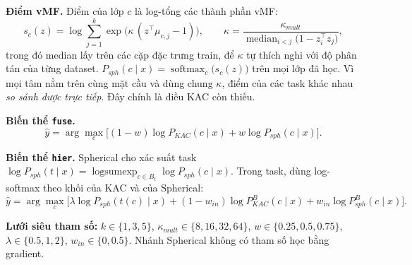 \documentclass[10pt,a4paper]{article}
\begin{document}
\textbf{Điểm vMF.} Điểm của lớp $c$ là log-tổng các thành phần vMF:
\begin{equation}
s_c(z) = \log \sum_{j=1}^{k} \exp\!\big(\kappa\,(z^\top \mu_{c,j} - 1)\big), \qquad
\kappa = \frac{\kappa_{mult}}{\operatorname{median}_{i<j}\big(1 - z_i^\top z_j\big)},
\end{equation}
trong đó median lấy trên các cặp đặc trưng train, để $\kappa$ tự thích nghi với độ phân tán của từng dataset. $P_{sph}(c\mid x) = \operatorname{softmax}_c\big(s_c(z)\big)$ trên mọi lớp đã học. Vì mọi tâm nằm trên cùng mặt cầu và dùng chung $\kappa$, điểm của các task khác nhau \emph{so sánh được trực tiếp}. Đây chính là điều KAC còn thiếu.

\textbf{Biến thể \texttt{fuse}.}
\begin{equation}
\label{eq:fuse}
\hat y = \arg\max_c \Big[(1-w)\log P_{KAC}(c\mid x) + w \log P_{sph}(c\mid x)\Big].
\end{equation}

\textbf{Biến thể \texttt{hier}.} Spherical cho xác suất task $\log P_{sph}(t\mid x) = \operatorname{logsumexp}_{c\in B_t}\log P_{sph}(c\mid x)$. Trong task, dùng log-softmax theo khối của KAC và của Spherical:
\begin{equation}
\label{eq:hier}
\hat y = \arg\max_c \Big[\lambda \log P_{sph}(t(c)\mid x) + (1-w_{in})\log P^{B}_{KAC}(c\mid x) + w_{in}\log P^{B}_{sph}(c\mid x)\Big].
\end{equation}

\textbf{Lưới siêu tham số:} $k\in\{1,3,5\}$, $\kappa_{mult}\in\{8,16,32,64\}$, $w\in\{0.25,0.5,0.75\}$, $\lambda\in\{0.5,1,2\}$, $w_{in}\in\{0,0.5\}$. Nhánh Spherical không có tham số học bằng gradient.
\end{document}
